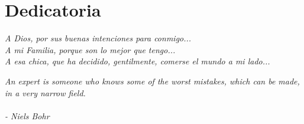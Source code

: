 \chapter*{Dedicatoria}

{\it A Dios, por sus buenas intenciones para conmigo...} \\[2mm]
{\it A mi Familia, porque son lo mejor que tengo...} \\[2mm]
{\it A esa chica, que ha decidido, gentilmente, comerse el mundo a mi lado...} \\[130mm]


\noindent\hfill 
\begin{minipage}{0.4\textwidth}
{\it An expert is someone who knows some of the worst mistakes, which can be made, in a very narrow field.} \\ \\
{\it - Niels Bohr}
\end{minipage} 